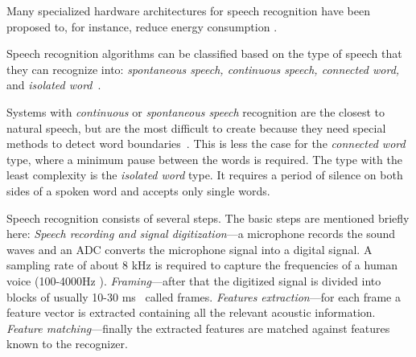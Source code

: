 Many specialized hardware architectures for speech recognition have been proposed to, for instance, reduce energy consumption \cite{price2018low,price20156}. 

Speech recognition algorithms can be classified based on the type of speech that they can recognize into: \textit{spontaneous speech, continuous speech, connected word,} and \textit{isolated word}~\cite{gaikwad2010review}.

Systems with \textit{continuous} or \textit{spontaneous speech} recognition are the closest to natural speech, but are the most difficult to create because they need special methods to detect word boundaries~\cite{gaikwad2010review}. This is less the case for the \textit{connected word} type, where a minimum pause between the words is required.
 The type with the least complexity is the \textit{isolated word} type. It requires a period of silence on both sides of a spoken word and accepts only single words. 

Speech recognition consists of several steps. The basic steps are mentioned briefly here:
\textit{Speech recording and signal digitization}---a microphone records the sound waves and an ADC converts the microphone signal into a digital signal. A sampling rate of about 8 kHz is required to capture the frequencies of a human voice (100-4000Hz \cite{Bernal-Ruiz2005}). \textit{Framing}---after that the digitized signal is divided into blocks of usually 10-30 ms~\cite{gaikwad2010review,delaney2002low,delaney2005energy} called frames. \textit{Features extraction}---for each frame a feature vector is extracted containing all the relevant acoustic information. \textit{Feature matching}---finally the extracted features are matched against features known to the recognizer. 

